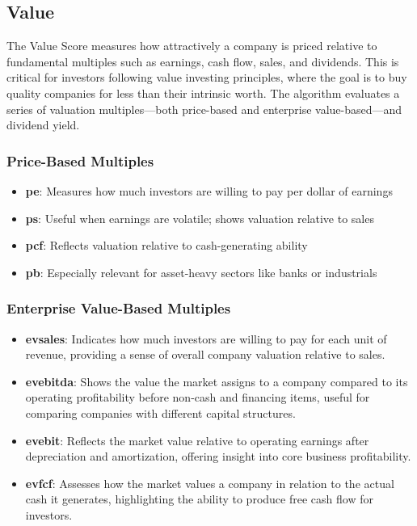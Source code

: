 \documentclass[11pt,english,a4paper,hidelinks]{book}
\begin{document}
\subsection{Value}
\noindent The Value Score measures how attractively a company is priced relative to fundamental multiples such as earnings, cash flow, sales, and dividends. This is critical for investors following value investing principles, where the goal is to buy quality companies for less than their intrinsic worth. The algorithm evaluates a series of valuation multiples—both price-based and enterprise value-based—and dividend yield.

\subsubsection{Price-Based Multiples}
\begin{itemize}
    \item \textbf{\acrshort{pe}}: Measures how much investors are willing to pay per dollar of earnings
    \item \textbf{\acrshort{ps}}: Useful when earnings are volatile; shows valuation relative to sales
    \item \textbf{\acrshort{pcf}}: Reflects valuation relative to cash-generating ability
    \item \textbf{\acrshort{pb}}: Especially relevant for asset-heavy sectors like banks or industrials
\end{itemize}

\subsubsection{Enterprise Value-Based Multiples}
\begin{itemize}
    \item \textbf{\acrshort{evsales}}: Indicates how much investors are willing to pay for each unit of revenue, providing a sense of overall company valuation relative to sales.
    \item \textbf{\acrshort{evebitda}}: Shows the value the market assigns to a company compared to its operating profitability before non-cash and financing items, useful for comparing companies with different capital structures.
    \item \textbf{\acrshort{evebit}}: Reflects the market value relative to operating earnings after depreciation and amortization, offering insight into core business profitability.
    \item \textbf{\acrshort{evfcf}}: Assesses how the market values a company in relation to the actual cash it generates, highlighting the ability to produce free cash flow for investors.
\end{itemize}
\end{document}
